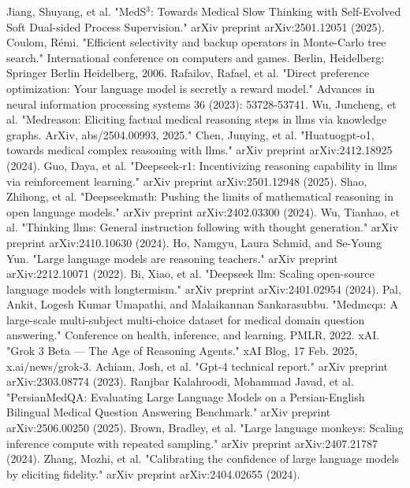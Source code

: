 \documentclass[conference]{IEEEtran}
\begin{document}
\begin{thebibliography}{00}
             Jiang, Shuyang, et al. "MedS$^ 3$: Towards Medical Slow Thinking with Self-Evolved Soft Dual-sided Process Supervision." arXiv preprint arXiv:2501.12051 (2025).
             Coulom, Rémi. "Efficient selectivity and backup operators in Monte-Carlo tree search." International conference on computers and games. Berlin, Heidelberg: Springer Berlin Heidelberg, 2006.
             Rafailov, Rafael, et al. "Direct preference optimization: Your language model is secretly a reward model." Advances in neural information processing systems 36 (2023): 53728-53741.
             Wu, Juncheng, et al. "Medreason: Eliciting factual medical reasoning steps in llms via knowledge graphs. ArXiv, abs/2504.00993, 2025."
             Chen, Junying, et al. "Huatuogpt-o1, towards medical complex reasoning with llms." arXiv preprint arXiv:2412.18925 (2024).
             Guo, Daya, et al. "Deepseek-r1: Incentivizing reasoning capability in llms via reinforcement learning." arXiv preprint arXiv:2501.12948 (2025).
             Shao, Zhihong, et al. "Deepseekmath: Pushing the limits of mathematical reasoning in open language models." arXiv preprint arXiv:2402.03300 (2024).
             Wu, Tianhao, et al. "Thinking llms: General instruction following with thought generation." arXiv preprint arXiv:2410.10630 (2024).
             Ho, Namgyu, Laura Schmid, and Se-Young Yun. "Large language models are reasoning teachers." arXiv preprint arXiv:2212.10071 (2022).
             Bi, Xiao, et al. "Deepseek llm: Scaling open-source language models with longtermism." arXiv preprint arXiv:2401.02954 (2024).
             Pal, Ankit, Logesh Kumar Umapathi, and Malaikannan Sankarasubbu. "Medmcqa: A large-scale multi-subject multi-choice dataset for medical domain question answering." Conference on health, inference, and learning. PMLR, 2022.
             xAI. "Grok 3 Beta — The Age of Reasoning Agents." xAI Blog, 17 Feb. 2025, x.ai/news/grok-3.
             Achiam, Josh, et al. "Gpt-4 technical report." arXiv preprint arXiv:2303.08774 (2023).
             Ranjbar Kalahroodi, Mohammad Javad, et al. "PersianMedQA: Evaluating Large Language Models on a Persian-English Bilingual Medical Question Answering Benchmark." arXiv preprint arXiv:2506.00250 (2025).
             Brown, Bradley, et al. "Large language monkeys: Scaling inference compute with repeated sampling." arXiv preprint arXiv:2407.21787 (2024).
             Zhang, Mozhi, et al. "Calibrating the confidence of large language models by eliciting fidelity." arXiv preprint arXiv:2404.02655 (2024).
            
         
	\end{thebibliography}
	
	
\end{document}
